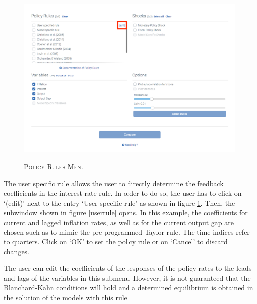 \begin{figure}[H]
	\centering
	\caption{\textsc{Policy Rules Menu}}
	\vspace{0.2cm}
	\includegraphics[width=15cm,keepaspectratio]{frontend_pr31.png}\\
	\label{img:PR}
\end{figure}

The user specific rule allows the user to directly determine the feedback coefficients in the interest rate rule. In order to do so, the user has to click on `(edit)' next to the entry `User specific rule' as shown in figure \ref{img:PR}. Then, the subwindow shown in figure \ref{userrule} opens. In this example, the coefficients for current and lagged inflation rates, as well as for the current output gap are chosen such as to mimic the pre-programmed Taylor rule. The time indices refer to quarters. Click on `OK' to set the policy rule or on `Cancel' to discard changes.

The user can edit the coefficients of the responses of the policy rates to the leads and lags of the variables in this submenu. However, it is not guaranteed that the Blanchard-Kahn conditions will hold and a determined equilibrium is obtained in the solution of the models with this rule. 

